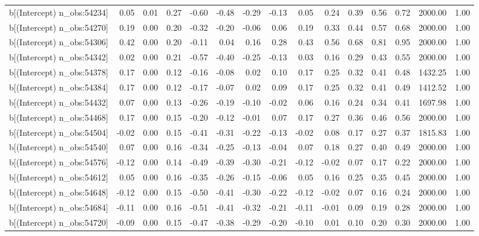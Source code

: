\begin{table}[ht]
\begin{tabular}{rrrrrrrrrrrrrrr}
  b[(Intercept) n\_obs:54234] & 0.05 & 0.01 & 0.27 & -0.60 & -0.48 & -0.29 & -0.13 & 0.05 & 0.24 & 0.39 & 0.56 & 0.72 & 2000.00 & 1.00 \\ 
  b[(Intercept) n\_obs:54270] & 0.19 & 0.00 & 0.20 & -0.32 & -0.20 & -0.06 & 0.06 & 0.19 & 0.33 & 0.44 & 0.57 & 0.68 & 2000.00 & 1.00 \\ 
  b[(Intercept) n\_obs:54306] & 0.42 & 0.00 & 0.20 & -0.11 & 0.04 & 0.16 & 0.28 & 0.43 & 0.56 & 0.68 & 0.81 & 0.95 & 2000.00 & 1.00 \\ 
  b[(Intercept) n\_obs:54342] & 0.02 & 0.00 & 0.21 & -0.57 & -0.40 & -0.25 & -0.13 & 0.03 & 0.16 & 0.29 & 0.43 & 0.55 & 2000.00 & 1.00 \\ 
  b[(Intercept) n\_obs:54378] & 0.17 & 0.00 & 0.12 & -0.16 & -0.08 & 0.02 & 0.10 & 0.17 & 0.25 & 0.32 & 0.41 & 0.48 & 1432.25 & 1.00 \\ 
  b[(Intercept) n\_obs:54384] & 0.17 & 0.00 & 0.12 & -0.17 & -0.07 & 0.02 & 0.09 & 0.17 & 0.25 & 0.32 & 0.41 & 0.49 & 1412.52 & 1.00 \\ 
  b[(Intercept) n\_obs:54432] & 0.07 & 0.00 & 0.13 & -0.26 & -0.19 & -0.10 & -0.02 & 0.06 & 0.16 & 0.24 & 0.34 & 0.41 & 1697.98 & 1.00 \\ 
  b[(Intercept) n\_obs:54468] & 0.17 & 0.00 & 0.15 & -0.20 & -0.12 & -0.01 & 0.07 & 0.17 & 0.27 & 0.36 & 0.46 & 0.56 & 2000.00 & 1.00 \\ 
  b[(Intercept) n\_obs:54504] & -0.02 & 0.00 & 0.15 & -0.41 & -0.31 & -0.22 & -0.13 & -0.02 & 0.08 & 0.17 & 0.27 & 0.37 & 1815.83 & 1.00 \\ 
  b[(Intercept) n\_obs:54540] & 0.07 & 0.00 & 0.16 & -0.34 & -0.25 & -0.13 & -0.04 & 0.07 & 0.18 & 0.27 & 0.40 & 0.49 & 2000.00 & 1.00 \\ 
  b[(Intercept) n\_obs:54576] & -0.12 & 0.00 & 0.14 & -0.49 & -0.39 & -0.30 & -0.21 & -0.12 & -0.02 & 0.07 & 0.17 & 0.22 & 2000.00 & 1.00 \\ 
  b[(Intercept) n\_obs:54612] & 0.05 & 0.00 & 0.16 & -0.35 & -0.26 & -0.15 & -0.06 & 0.05 & 0.16 & 0.25 & 0.35 & 0.45 & 2000.00 & 1.00 \\ 
  b[(Intercept) n\_obs:54648] & -0.12 & 0.00 & 0.15 & -0.50 & -0.41 & -0.30 & -0.22 & -0.12 & -0.02 & 0.07 & 0.16 & 0.24 & 2000.00 & 1.00 \\ 
  b[(Intercept) n\_obs:54684] & -0.11 & 0.00 & 0.16 & -0.51 & -0.41 & -0.32 & -0.21 & -0.11 & -0.01 & 0.09 & 0.19 & 0.28 & 2000.00 & 1.00 \\ 
  b[(Intercept) n\_obs:54720] & -0.09 & 0.00 & 0.15 & -0.47 & -0.38 & -0.29 & -0.20 & -0.10 & 0.01 & 0.10 & 0.20 & 0.30 & 2000.00 & 1.00 \\ 

\end{tabular}
\end{table}
